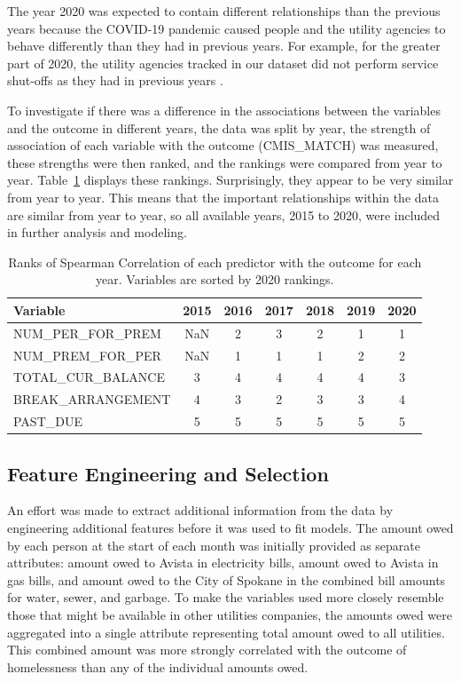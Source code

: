\documentclass[10pt,letterpaper]{article}
\begin{document}
The year 2020 was expected to contain different relationships than the previous years because the COVID-19 pandemic caused people and the utility agencies to behave differently than they had in previous years. For example, for the greater part of 2020, the utility agencies tracked in our dataset did not perform service shut-offs as they had in previous years \cite{white2020utilities}. 

To investigate if there was a difference in the associations between the variables and the outcome in different years, the data was split by year, the strength of association of each variable with the outcome (CMIS\_MATCH) was measured, these strengths were then ranked, and the rankings were compared from year to year. Table~\ref{tbl:corr_years} displays these rankings. Surprisingly, they appear to be very similar from year to year. This means that the important relationships within the data are similar from year to year, so all available years, 2015 to 2020, were included in further analysis and modeling.

\begin{table}[!h]
    \centering
    \begin{tabular}{lcccccc}
        \toprule
                 Variable &  2015 &  2016 &  2017 &  2018 &  2019 &  2020 \\
        \midrule
         NUM\_PER\_FOR\_PREM &   NaN &     2 &     3 &     2 &     1 &     1 \\
         NUM\_PREM\_FOR\_PER &   NaN &     1 &     1 &     1 &     2 &     2 \\
        TOTAL\_CUR\_BALANCE &     3 &     4 &     4 &     4 &     4 &     3 \\
        BREAK\_ARRANGEMENT &     4 &     3 &     2 &     3 &     3 &     4 \\
                 PAST\_DUE &     5 &     5 &     5 &     5 &     5 &     5 \\
        \bottomrule
    \end{tabular}
\caption{Ranks of Spearman Correlation of each predictor with the outcome for each year. Variables are sorted by 2020 rankings.}
\label{tbl:corr_years}
\end{table}

\subsection*{Feature Engineering and Selection}
An effort was made to extract additional information from the data by engineering additional features before it was used to fit models. The amount owed by each person at the start of each month was initially provided as separate attributes: amount owed to Avista in electricity bills, amount owed to Avista in gas bills, and amount owed to the City of Spokane in the combined bill amounts for water, sewer, and garbage. To make the variables used more closely resemble those that might be available in other utilities companies, the amounts owed were aggregated into a single attribute representing total amount owed to all utilities. This combined amount was more strongly correlated with the outcome of homelessness than any of the individual amounts owed.
\end{document}
